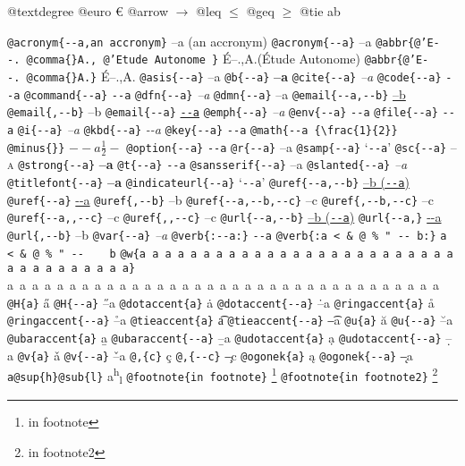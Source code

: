 \documentclass{book}
\newcommand\GNUTexinfocommandstyletextcite[1]{{\normalfont{}\textsl{#1}}}%
\newcommand\GNUTexinfocommandstyletextvar[1]{{\normalfont{}\textsl{#1}}}%
\begin{document}
\begin{titlepage}
@textdegree \textdegree{}
@euro \euro{}
@arrow $\rightarrow{}$
@leq $\leq{}$
@geq $\geq{}$
@tie a\hbox{}b

\texttt{@acronym\{{-}{-}a,an accronym\}} --a (an accronym)
\texttt{@acronym\{{-}{-}a\}} --a
\texttt{@abbr\{@'E{-}{-}.\ @comma\{\}A.,\ @'Etude Autonome \}} \'{E}--.\@ ,A.\@ (\'{E}tude Autonome)
\texttt{@abbr\{@'E{-}{-}.\ @comma\{\}A.\}} \'{E}--.\@ ,A.\@
\texttt{@asis\{{-}{-}a\}} --a
\texttt{@b\{{-}{-}a\}} \textbf{--a}
\texttt{@cite\{{-}{-}a\}} \GNUTexinfocommandstyletextcite{--a}
\texttt{@code\{{-}{-}a\}} \texttt{{-}{-}a}
\texttt{@command\{{-}{-}a\}} \texttt{{-}{-}a}
\texttt{@dfn\{{-}{-}a\}} \textsl{--a}
\texttt{@dmn\{{-}{-}a\}} \thinspace --a
\texttt{@email\{{-}{-}a,{-}{-}b\}} \href{mailto:--a}{--b}
\texttt{@email\{,{-}{-}b\}} --b
\texttt{@email\{{-}{-}a\}} \href{mailto:--a}{\nolinkurl{--a}}
\texttt{@emph\{{-}{-}a\}} \emph{--a}
\texttt{@env\{{-}{-}a\}} \texttt{{-}{-}a}
\texttt{@file\{{-}{-}a\}} \texttt{{-}{-}a}
\texttt{@i\{{-}{-}a\}} \textit{--a}
\texttt{@kbd\{{-}{-}a\}} {\ttfamily\textsl{{-}{-}a}}
\texttt{@key\{{-}{-}a\}} \texttt{{-}{-}a}
\texttt{@math\{{-}{-}a \{\textbackslash{}frac\{1\}\{2\}\} @minus\{\}\}} $--a {\frac{1}{2}} -$
\texttt{@option\{{-}{-}a\}} \texttt{{-}{-}a}
\texttt{@r\{{-}{-}a\}} \textnormal{--a}
\texttt{@samp\{{-}{-}a\}} `\texttt{{-}{-}a}'
\texttt{@sc\{{-}{-}a\}} \textsc{--a}
\texttt{@strong\{{-}{-}a\}} \textbf{--a}
\texttt{@t\{{-}{-}a\}} \texttt{{-}{-}a}
\texttt{@sansserif\{{-}{-}a\}} \textsf{--a}
\texttt{@slanted\{{-}{-}a\}} \textsl{--a}
\texttt{@titlefont\{{-}{-}a\}} {\huge \bfseries --a}
\texttt{@indicateurl\{{-}{-}a\}} `\texttt{{-}{-}a}'
\texttt{@uref\{{-}{-}a,{-}{-}b\}} \href{--a}{--b (\nolinkurl{--a})}
\texttt{@uref\{{-}{-}a\}} \url{--a}
\texttt{@uref\{,{-}{-}b\}} --b
\texttt{@uref\{{-}{-}a,{-}{-}b,{-}{-}c\}} --c
\texttt{@uref\{,{-}{-}b,{-}{-}c\}} --c
\texttt{@uref\{{-}{-}a{,}{,}{-}{-}c\}} --c
\texttt{@uref\{{,}{,}{-}{-}c\}} --c
\texttt{@url\{{-}{-}a,{-}{-}b\}} \href{--a}{--b (\nolinkurl{--a})}
\texttt{@url\{{-}{-}a,\}} \url{--a}
\texttt{@url\{,{-}{-}b\}} --b
\texttt{@var\{{-}{-}a\}} \GNUTexinfocommandstyletextvar{--a}
\texttt{@verb\{:{-}{-}a:\}} \verb:--a:
\texttt{@verb\{:a  < \& @ \% " {-}{-}    b:\}} \verb:a  < & @ % " --    b:
\texttt{@w\{a a a a a a a a a a a a a a a a a a a a a a a a a a a a a a a a a a a\}} \hbox{a a a a a a a a a a a a a a a a a a a a a a a a a a a a a a a a a a a}
\texttt{@H\{a\}} \H{a}
\texttt{@H\{{-}{-}a\}} \H{--a}
\texttt{@dotaccent\{a\}} \.{a}
\texttt{@dotaccent\{{-}{-}a\}} \.{--a}
\texttt{@ringaccent\{a\}} \r{a}
\texttt{@ringaccent\{{-}{-}a\}} \r{--a}
\texttt{@tieaccent\{a\}} \t{a}
\texttt{@tieaccent\{{-}{-}a\}} \t{--a}
\texttt{@u\{a\}} \u{a}
\texttt{@u\{{-}{-}a\}} \u{--a}
\texttt{@ubaraccent\{a\}} \b{a}
\texttt{@ubaraccent\{{-}{-}a\}} \b{--a}
\texttt{@udotaccent\{a\}} \d{a}
\texttt{@udotaccent\{{-}{-}a\}} \d{--a}
\texttt{@v\{a\}} \v{a}
\texttt{@v\{{-}{-}a\}} \v{--a}
\texttt{@,\{c\}} \c{c}
\texttt{@,\{{-}{-}c\}} \c{--c}
\texttt{@ogonek\{a\}} \k{a}
\texttt{@ogonek\{{-}{-}a\}} \k{--a}
\texttt{a@sup\{h\}@sub\{l\}} a\textsuperscript{h}\textsubscript{l}
\texttt{@footnote\{in footnote\}} \footnote{in footnote}
\texttt{@footnote\{in footnote2\}} \footnote{in footnote2}


\end{titlepage}
\end{document}
